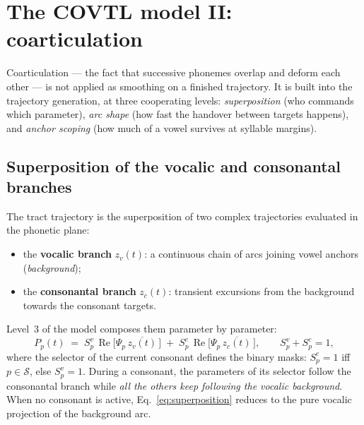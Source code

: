 \documentclass[11pt,a4paper]{article}
\begin{document}
\section{The COVTL model II: coarticulation}\label{sec:coart}

Coarticulation --- the fact that successive phonemes overlap and deform
each other --- is not applied as smoothing on a finished trajectory. It
is built into the trajectory generation, at three cooperating levels:
\emph{superposition} (who commands which parameter), \emph{arc shape}
(how fast the handover between targets happens), and \emph{anchor
scoping} (how much of a vowel survives at syllable margins).

\subsection{Superposition of the vocalic and consonantal branches}\label{subsec:superposition}

The tract trajectory is the superposition of two complex trajectories
evaluated in the phonetic plane:
\begin{itemize}[leftmargin=1.5em]
\item the \textbf{vocalic branch} \(z_v(t)\): a continuous chain of arcs
      joining vowel anchors (\emph{background});
\item the \textbf{consonantal branch} \(z_c(t)\): transient excursions
      from the background towards the consonant targets.
\end{itemize}
Level~3 of the model composes them parameter by parameter:
\begin{equation}
P_p(t) \;=\; S^v_p\,\operatorname{Re}\!\big[\Psi_p\,\overline{z_v(t)}\,\big]
\;+\; S^c_p\,\operatorname{Re}\!\big[\Psi_p\,\overline{z_c(t)}\,\big],
\qquad S^v_p + S^c_p = 1,
\label{eq:superposition}
\end{equation}
where the selector of the current consonant defines the binary masks:
\(S^c_p = 1\) iff \(p \in \mathcal{S}\), else \(S^v_p = 1\). During a
consonant, the parameters of its selector follow the consonantal branch
while \emph{all the others keep following the vocalic background}. When no
consonant is active, Eq.~\eqref{eq:superposition} reduces to the pure
vocalic projection of the background arc.
\end{document}

